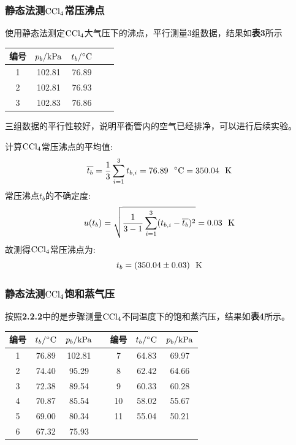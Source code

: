 \documentclass[12pt]{article}
\begin{document}
		\subsubsection{静态法测$\rm CCl_{4}$常压沸点}
		使用静态法测定$\rm CCl_{4}$大气压下的沸点，平行测量3组数据，结果如\textbf{表3}所示\par
		\begin{table}[h]
			\centering
			\begin{tabular}{ccccc}
				\toprule
				编号 & $p_{b}/{\rm kPa}$& $t_{b}/{\rm ^{\circ}C}$ \\
				\midrule
				1 & 102.81 & 76.89\\
				2 & 102.81 & 76.93\\
				3 & 102.83 & 76.86\\
				\bottomrule
			\end{tabular}
		\end{table}
		\par
		三组数据的平行性较好，说明平衡管内的空气已经排净，可以进行后续实验。\par
		计算$\rm CCl_{4}$常压沸点的平均值:
		$$
			\overline{t_{b}}=\frac{1}{3}\sum_{i=1}^{3}t_{b,i}=76.89\ \ {\rm ^{\circ}C}= 350.04\ \ {\rm K}
		$$
		常压沸点$t_{b}$的不确定度:
		$$
			u(t_{b})=\sqrt{\frac{1}{3-1}\sum_{i=1}^{3}(t_{b,i}-\overline{t_{b}})^{2}}=0.03\ \ {\rm K}
		$$
		故测得$\rm CCl_{4}$常压沸点为:
		$$
			t_{b}=(350.04\pm 0.03)\ \ {\rm K}
		$$
		\par
		\subsubsection{静态法测$\rm CCl_{4}$饱和蒸气压}
		按照\textbf{2.2.2}中的是步骤测量$\rm CCl_{4}$不同温度下的饱和蒸汽压，结果如\textbf{表4}所示。
		\begin{table}[h]
			\centering
			\begin{tabular}{ccccccc}
				\toprule
				编号 & $t_{b}/{\rm ^{\circ}C}$& $p_{b}/{\rm kPa}$ &&编号 & $t_{b}/{\rm ^{\circ}C}$ & $p_{b}/{\rm kPa}$  \\
				\midrule
				1  & 76.89 & 102.81 &&7& 64.83 & 69.97\\
				2  & 74.40 & 95.29 &&8& 62.42 & 64.66 \\
				3  & 72.38 & 89.54 &&9& 60.33 & 60.28\\
				4  & 70.87 & 85.54 &&10& 58.02 & 55.67  \\
				5  & 69.00 & 80.34 &&11& 55.04 & 50.21 \\
				6  & 67.32 & 75.93 &&&& \\
				\bottomrule
			\end{tabular}
		\end{table}
		\par
\end{document}
